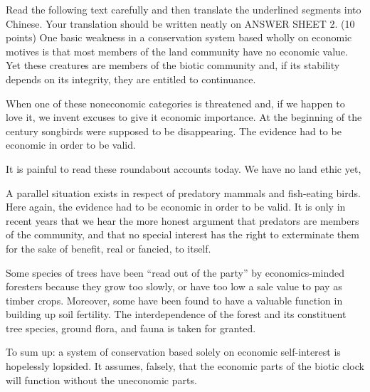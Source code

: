 \documentclass[12pt,a4paper]{article}
\begin{document}
\begin{translation}{
  Read the following text carefully and then translate the underlined segments into Chinese. Your translation should be written neatly on ANSWER SHEET 2. (10 points)
}
One basic weakness in a conservation system based wholly on economic motives is that most members of the land community have no economic value. Yet these creatures are members of the biotic community and, if its stability depends on its integrity, they are entitled to continuance.

When one of these noneconomic categories is threatened and, if we happen to love it, we invent excuses to give it economic importance. At the beginning of the century songbirds were supposed to be disappearing.  The evidence had to be economic in order to be valid.

It is painful to read these roundabout accounts today. We have no land ethic yet, 

A parallel situation exists in respect of predatory mammals and fish-eating birds.  Here again, the evidence had to be economic in order to be valid. It is only in recent years that we hear the more honest argument that predators are members of the community, and that no special interest has the right to exterminate them for the sake of benefit, real or fancied, to itself.

Some species of trees have been ``read out of the party'' by economics-minded foresters because they grow too slowly, or have too low a sale value to pay as timber crops.  Moreover, some have been found to have a valuable function in building up soil fertility. The interdependence of the forest and its constituent tree species, ground flora, and fauna is taken for granted.

To sum up: a system of conservation based solely on economic self-interest is hopelessly lopsided.  It assumes, falsely, that the economic parts of the biotic clock will function without the uneconomic parts.
\end{translation}
\end{document}
